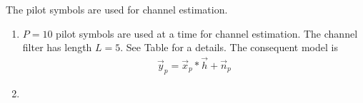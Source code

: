 The pilot symbols are used for channel estimation.
\begin{enumerate}[label=\thesubsection.\arabic*.,ref=\thesubsection.\theenumi]


\item $P=10$ pilot symbols are used at a time for channel estimation.  The channel filter has length $L=5$.  See Table \label{table:ChannelParams} for a details.
The consequent model is
\begin{align}
\vec{y}_p = \vec{x}_p*\vec{h}+ \vec{n}_p
\end{align}
\begin{table}[!h]
\centering

\caption{}
\label{table:ChannelParams}
\end{table}
\item 
\end{enumerate}
